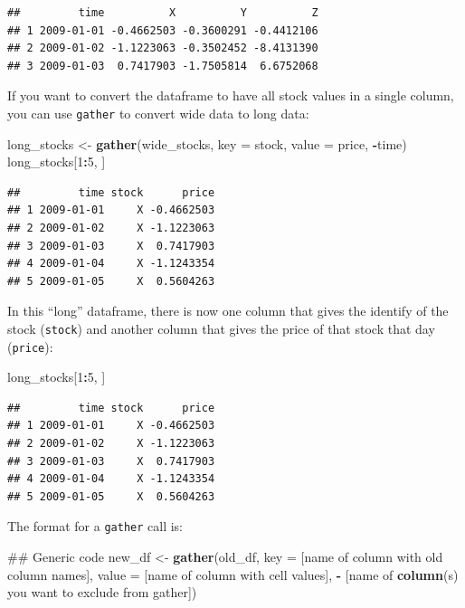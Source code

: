 \documentclass[]{book}
\makeatletter
\newenvironment{Shaded}{\begin{snugshade}}{\end{snugshade}}
\newcommand{\KeywordTok}[1]{\textcolor[rgb]{0.13,0.29,0.53}{\textbf{#1}}}
\newcommand{\DataTypeTok}[1]{\textcolor[rgb]{0.13,0.29,0.53}{#1}}
\newcommand{\DecValTok}[1]{\textcolor[rgb]{0.00,0.00,0.81}{#1}}
\newcommand{\StringTok}[1]{\textcolor[rgb]{0.31,0.60,0.02}{#1}}
\newcommand{\OperatorTok}[1]{\textcolor[rgb]{0.81,0.36,0.00}{\textbf{#1}}}
\newcommand{\NormalTok}[1]{#1}
\newenvironment{kframe}{%
\medskip{}
\setlength{\fboxsep}{.8em}
 \def\at@end@of@kframe{}%
 \ifinner\ifhmode%
  \def\at@end@of@kframe{\end{minipage}}%
  \begin{minipage}{\columnwidth}%
 \fi\fi%
 \def\FrameCommand##1{\hskip\@totalleftmargin \hskip-\fboxsep
 \colorbox{shadecolor}{##1}\hskip-\fboxsep
     \hskip-\linewidth \hskip-\@totalleftmargin \hskip\columnwidth}%
 \MakeFramed {\advance\hsize-\width
   \@totalleftmargin\z@ \linewidth\hsize
   \@setminipage}}%
 {\par\unskip\endMakeFramed%
 \at@end@of@kframe}
\renewenvironment{Shaded}{\begin{kframe}}{\end{kframe}}
\theoremstyle{definition}
\theoremstyle{definition}
\theoremstyle{definition}
\theoremstyle{remark}
\makeatother
\begin{document}
\begin{verbatim}
##         time          X          Y          Z
## 1 2009-01-01 -0.4662503 -0.3600291 -0.4412106
## 2 2009-01-02 -1.1223063 -0.3502452 -8.4131390
## 3 2009-01-03  0.7417903 -1.7505814  6.6752068
\end{verbatim}

If you want to convert the dataframe to have all stock values in a
single column, you can use \texttt{gather} to convert wide data to long
data:

\begin{Shaded}
\begin{Highlighting}[]
\NormalTok{long_stocks <-}\StringTok{ }\KeywordTok{gather}\NormalTok{(wide_stocks, }\DataTypeTok{key =}\NormalTok{ stock,}
                      \DataTypeTok{value =}\NormalTok{ price, }\OperatorTok{-}\NormalTok{time)}
\NormalTok{long_stocks[}\DecValTok{1}\OperatorTok{:}\DecValTok{5}\NormalTok{, ]}
\end{Highlighting}
\end{Shaded}

\begin{verbatim}
##         time stock      price
## 1 2009-01-01     X -0.4662503
## 2 2009-01-02     X -1.1223063
## 3 2009-01-03     X  0.7417903
## 4 2009-01-04     X -1.1243354
## 5 2009-01-05     X  0.5604263
\end{verbatim}

In this ``long'' dataframe, there is now one column that gives the
identify of the stock (\texttt{stock}) and another column that gives the
price of that stock that day (\texttt{price}):

\begin{Shaded}
\begin{Highlighting}[]
\NormalTok{long_stocks[}\DecValTok{1}\OperatorTok{:}\DecValTok{5}\NormalTok{, ]}
\end{Highlighting}
\end{Shaded}

\begin{verbatim}
##         time stock      price
## 1 2009-01-01     X -0.4662503
## 2 2009-01-02     X -1.1223063
## 3 2009-01-03     X  0.7417903
## 4 2009-01-04     X -1.1243354
## 5 2009-01-05     X  0.5604263
\end{verbatim}

The format for a \texttt{gather} call is:

\begin{Shaded}
\begin{Highlighting}[]
\NormalTok{## Generic code}
\NormalTok{new_df <-}\StringTok{ }\KeywordTok{gather}\NormalTok{(old_df,}
                 \DataTypeTok{key =}\NormalTok{ [name of column with old column names],}
                 \DataTypeTok{value =}\NormalTok{ [name of column with cell values],}
                 \OperatorTok{-}\StringTok{ }\NormalTok{[name of }\KeywordTok{column}\NormalTok{(s) you want to }
\NormalTok{                    exclude from gather])}
\end{Highlighting}
\end{Shaded}
\end{document}
